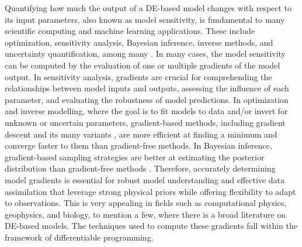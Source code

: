Quantifying how much the output of a DE-based model changes with respect to its input parameters, also known as model sensitivity, is fundamental to many scientific computing and machine learning applications. 
These include optimization, sensitivity analysis, Bayesian inference, inverse methods, and uncertainty quantification, among many \cite{Razavi.2021}. 
In many cases, the model sensitivity can be computed by the evaluation of one or multiple gradients of the model output. 
In sensitivity analysis, gradients are crucial for comprehending the relationships between model inputs and outputs, assessing the influence of each parameter, and evaluating the robustness of model predictions. 
In optimization and inverse modelling, where the goal is to fit models to data and/or invert for unknown or uncertain parameters, gradient-based methods, including gradient descent and its many variants \cite{ruder2016overview-gradient-descent}, are more efficient at finding a minimum and converge faster to them than gradient-free methods.
In Bayesian inference, gradient-based sampling strategies are better at estimating the posterior distribution than gradient-free methods \cite{neal2011mcmc}.
Therefore, accurately determining model gradients is essential for robust model understanding and effective data assimilation that leverage strong physical priors while offering flexibility to adapt to observations. 
This is very appealing in fields such as computational physics, geophysics, and biology, to mention a few, where there is a broad literature on DE-based models.
The techniques used to compute these gradients fall within the framework of differentiable programming.

